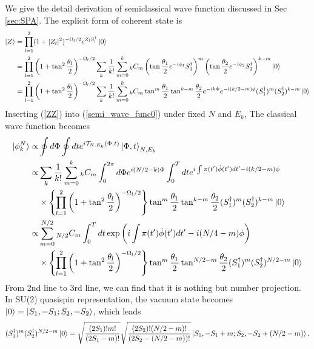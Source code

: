 \documentclass[%
superscriptaddress,
preprint,
showpacs,
nofootinbib,
amsmath,amssymb,
prc,
floatfix ]%
{revtex4-1}
\begin{document}
We give the detail derivation of semiclassical wave function 
discussed in Sec \ref{sec:SPA}. The explicit form of coherent state is
\begin{align}
  \ket{Z} &= \prod_{l=1}^2(1+|Z_l|^2)^{-\Omega_l/2}e^{Z_lS_l^{\dag}}\ket{0} \nonumber \\
  &= \prod_{l=1}^2\left(1+\tan^2{\frac{\theta_l}{2}}\right)^{-\Omega_l/2} \sum_k \frac{1}{k!} \sum_{m=0}^k
  {}_kC_m \left(
  \tan{\frac{\theta_1}{2}}e^{-i\phi_1}S_1^{\dag} \right)^m \left(
  \tan{\frac{\theta_2}{2}}e^{-i\phi_2}S_2^{\dag} \right)^{k-m} \ket{0} \nonumber \\
  &= \prod_{l=1}^2\left(1+\tan^2{\frac{\theta_l}{2}}\right)^{-\Omega_l/2} \sum_k \frac{1}{k!} \sum_{m=0}^k
  {}_kC_m \tan^m{\frac{\theta_1}{2}}\tan^{k-m}{\frac{\theta_2}{2}}e^{-ik\Phi}e^{-i(k/2-m)\phi}
  (S_1^{\dag})^m(S_2^{\dag})^{k-m} \ket{0}
  \label{ZZ}
\end{align} 
Inserting (\ref{ZZ}) into (\ref{semi_wave_func0}) under fixed $N$ and $E_k$, The classical wave function becomes
\begin{align}
	\ket{\phi_k^N} \propto& \oint d\Phi \oint dt
	e^{i\mathcal{T}_{N,E_k}(\Phi, t)}
	\ket{\Phi,t}_{N,E_k} \nonumber \\
  \propto& \sum_k \frac{1}{k!} \sum_{m=0}^k{}_kC_m \int_0^{2\pi} d\Phi e^{i(N/2-k)\Phi} 
  \int_0^T dt e^{i\int \pi(t') \dot{\phi}(t') dt'-i(k/2-m)\phi} \nonumber \\
  &\times \left\{ \prod_{l=1}^2\left(1+\tan^2{\frac{\theta_l}{2}}\right)^{-\Omega_l/2} \right\}
\tan^m{\frac{\theta_1}{2}}\tan^{k-m}\frac{\theta_2}{2}(S_1^{\dag})^m(S_2^{\dag})^{k-m} \ket{0} \nonumber \\
  \propto& \sum_{m=0}^{N/2}{}_{N/2}C_m  \int_0^T dt \exp{\left( i\int \pi(t') \dot{\phi}(t') dt'-i(N/4-m)\phi \right)} \nonumber \\
  &\times \left\{ \prod_{l=1}^2\left(1+\tan^2{\frac{\theta_l}{2}}\right)^{-\Omega_l/2} \right\} 
\tan^m{\frac{\theta_1}{2}}\tan^{N/2-m}\frac{\theta_2}{2} (S_1^{\dag})^m(S_2^{\dag})^{N/2-m} \ket{0} \label{semi_wave_func_b}
\end{align}
From 2nd line to 3rd line, we can find that it is nothing but number projection. In SU(2) quasispin representation, the vacuum state becomes $\ket{0}=\ket{S_1,-S_1;S_2,-S_2}$, which leads
\begin{align}
  (S_1^{\dag})^m(S_2^{\dag})^{N/2-m} \ket{0} 
  = \sqrt{\frac{(2S_1)!m!}{(2S_1-m)!}} \sqrt{\frac{(2S_2)!(N/2-m)!}{(2S_2-(N/2-m))!}}
  \ket{S_1,-S_1+m;S_2,-S_2+(N/2-m)}.
\end{align}
\end{document}
